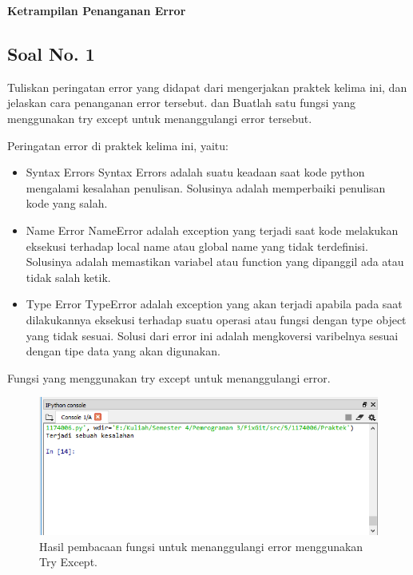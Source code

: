 \hfill \break
{\Large \textbf{Ketrampilan Penanganan Error}}

\subsection{Soal No. 1}
Tuliskan  peringatan  error  yang  didapat  dari  mengerjakan  praktek  kelima  ini, dan  jelaskan  cara  penanganan  error  tersebut.   dan  Buatlah  satu  fungsi  yang menggunakan try except untuk menanggulangi error tersebut.

\hfill \break
Peringatan error di praktek kelima ini, yaitu:
\begin{itemize}
	\item Syntax Errors
	Syntax Errors adalah suatu keadaan saat kode python mengalami kesalahan penulisan. Solusinya adalah memperbaiki penulisan kode yang salah.
	
	\item Name Error
	NameError adalah exception yang terjadi saat kode melakukan eksekusi terhadap local name atau global name yang tidak terdefinisi. Solusinya adalah memastikan variabel atau function yang dipanggil ada atau tidak salah ketik.
	
	\item Type Error
	TypeError adalah exception yang akan terjadi apabila pada saat dilakukannya eksekusi terhadap suatu operasi atau fungsi dengan type object yang tidak sesuai. Solusi dari error ini adalah mengkoversi varibelnya sesuai dengan tipe data yang akan digunakan.
\end{itemize}

\hfill \break
Fungsi yang menggunakan try except untuk menanggulangi error.



\begin{figure}[H]
	\includegraphics[width=12cm]{figures/5/1174006/Praktek/5.png}
	\centering
	\caption{Hasil pembacaan fungsi untuk menanggulangi error menggunakan Try Except.}
\end{figure}

